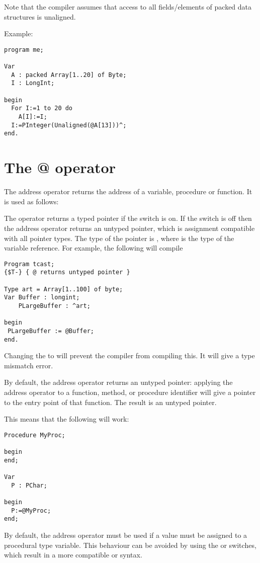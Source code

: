 Note that the compiler assumes that access to all fields/elements of
packed data structures is unaligned.

Example:
\begin{verbatim}
program me;

Var
  A : packed Array[1..20] of Byte;
  I : LongInt;

begin
  For I:=1 to 20 do
    A[I]:=I;
  I:=PInteger(Unaligned(@A[13]))^;
end.
\end{verbatim}

\section{The @ operator}

The address operator  returns the address of a variable, procedure
or function. It is used as follows:

The  operator returns a typed pointer if the  switch is on.
If the  switch is off then the address operator returns an untyped
pointer, which is assignment compatible with all pointer types. The type of
the pointer is , where  is the type of the variable
reference.
For example, the following will compile
\begin{verbatim}
Program tcast;
{$T-} { @ returns untyped pointer }

Type art = Array[1..100] of byte;
Var Buffer : longint;
    PLargeBuffer : ^art;

begin
 PLargeBuffer := @Buffer;
end.
\end{verbatim}
Changing the  to  will prevent the compiler from
compiling this. It will give a type mismatch error.

By default, the address operator returns an untyped pointer: applying 
the address operator to a function, method, or procedure identifier 
will give a pointer to the entry point of that function. 
The result is an untyped pointer.

This means that the following will work:
\begin{verbatim}
Procedure MyProc;

begin
end;

Var
  P : PChar;
 
begin
  P:=@MyProc;
end; 
\end{verbatim}
By default, the address operator must be used if a value must be assigned
to a procedural type variable. This behaviour can be avoided by using the
 or  switches, which result in a more compatible 
\delphi or \tp syntax.

